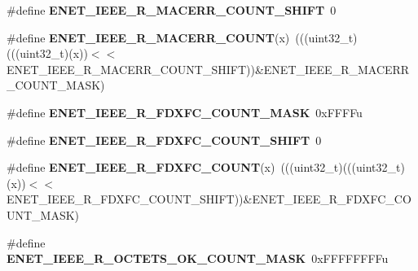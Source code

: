 \begin{DoxyCompactItemize}
\item 
\#define {\bfseries E\+N\+E\+T\+\_\+\+I\+E\+E\+E\+\_\+\+R\+\_\+\+M\+A\+C\+E\+R\+R\+\_\+\+C\+O\+U\+N\+T\+\_\+\+S\+H\+I\+FT}~0\hypertarget{group__ENET__Register__Masks_ga80d5b1a8081a8c2f0601dea66aeb5d04}{}\label{group__ENET__Register__Masks_ga80d5b1a8081a8c2f0601dea66aeb5d04}

\item 
\#define {\bfseries E\+N\+E\+T\+\_\+\+I\+E\+E\+E\+\_\+\+R\+\_\+\+M\+A\+C\+E\+R\+R\+\_\+\+C\+O\+U\+NT}(x)~(((uint32\+\_\+t)(((uint32\+\_\+t)(x))$<$$<$E\+N\+E\+T\+\_\+\+I\+E\+E\+E\+\_\+\+R\+\_\+\+M\+A\+C\+E\+R\+R\+\_\+\+C\+O\+U\+N\+T\+\_\+\+S\+H\+I\+FT))\&E\+N\+E\+T\+\_\+\+I\+E\+E\+E\+\_\+\+R\+\_\+\+M\+A\+C\+E\+R\+R\+\_\+\+C\+O\+U\+N\+T\+\_\+\+M\+A\+SK)\hypertarget{group__ENET__Register__Masks_gaefde5abf1a53c9ab231f653876924e7f}{}\label{group__ENET__Register__Masks_gaefde5abf1a53c9ab231f653876924e7f}

\item 
\#define {\bfseries E\+N\+E\+T\+\_\+\+I\+E\+E\+E\+\_\+\+R\+\_\+\+F\+D\+X\+F\+C\+\_\+\+C\+O\+U\+N\+T\+\_\+\+M\+A\+SK}~0x\+F\+F\+F\+Fu\hypertarget{group__ENET__Register__Masks_gae1bb815cfd879ec0c78889dfcb089247}{}\label{group__ENET__Register__Masks_gae1bb815cfd879ec0c78889dfcb089247}

\item 
\#define {\bfseries E\+N\+E\+T\+\_\+\+I\+E\+E\+E\+\_\+\+R\+\_\+\+F\+D\+X\+F\+C\+\_\+\+C\+O\+U\+N\+T\+\_\+\+S\+H\+I\+FT}~0\hypertarget{group__ENET__Register__Masks_ga31cd2bb10ff9c6d13dc7fede6f4d54d3}{}\label{group__ENET__Register__Masks_ga31cd2bb10ff9c6d13dc7fede6f4d54d3}

\item 
\#define {\bfseries E\+N\+E\+T\+\_\+\+I\+E\+E\+E\+\_\+\+R\+\_\+\+F\+D\+X\+F\+C\+\_\+\+C\+O\+U\+NT}(x)~(((uint32\+\_\+t)(((uint32\+\_\+t)(x))$<$$<$E\+N\+E\+T\+\_\+\+I\+E\+E\+E\+\_\+\+R\+\_\+\+F\+D\+X\+F\+C\+\_\+\+C\+O\+U\+N\+T\+\_\+\+S\+H\+I\+FT))\&E\+N\+E\+T\+\_\+\+I\+E\+E\+E\+\_\+\+R\+\_\+\+F\+D\+X\+F\+C\+\_\+\+C\+O\+U\+N\+T\+\_\+\+M\+A\+SK)\hypertarget{group__ENET__Register__Masks_ga7ca7799d3ca80b9a7927af20025f6cf9}{}\label{group__ENET__Register__Masks_ga7ca7799d3ca80b9a7927af20025f6cf9}

\item 
\#define {\bfseries E\+N\+E\+T\+\_\+\+I\+E\+E\+E\+\_\+\+R\+\_\+\+O\+C\+T\+E\+T\+S\+\_\+\+O\+K\+\_\+\+C\+O\+U\+N\+T\+\_\+\+M\+A\+SK}~0x\+F\+F\+F\+F\+F\+F\+F\+Fu\hypertarget{group__ENET__Register__Masks_gab0a6815c67b330a4261dae4a7da445b5}{}\label{group__ENET__Register__Masks_gab0a6815c67b330a4261dae4a7da445b5}


\end{DoxyCompactItemize}
